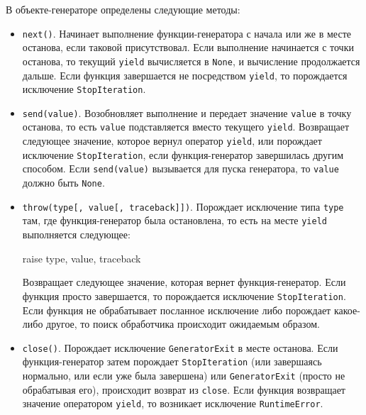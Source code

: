 В объекте-генераторе определены следующие методы:
\begin{itemize}
  \item \lstinline{next()}. Начинает выполнение функции-генератора с начала или же в месте останова, если таковой присутствовал. Если выполнение начинается с точки останова, то текущий \lstinline{yield} вычисляется в \lstinline{None}, и вычисление продолжается дальше. Если функция завершается не посредством \lstinline{yield}, то порождается исключение \lstinline{StopIteration}.

  \item \lstinline{send(value)}. Возобновляет выполнение и передает значение \lstinline{value} в точку останова, то есть \lstinline{value} подставляется вместо текущего \lstinline{yield}. Возвращает следующее значение, которое вернул оператор \lstinline{yield}, или порождает исключение \lstinline{StopIteration}, если функция-генератор завершилась другим способом. Если \lstinline{send(value)} вызывается для пуска генератора, то \lstinline{value} должно быть \lstinline{None}.

  \item \lstinline{throw(type[, value[, traceback]])}. Порождает исключение типа \lstinline{type} там, где функция-генератор была остановлена, то есть на месте \lstinline{yield} выполняется следующее:
\begin{pylst}{}{}
raise type, value, traceback
\end{pylst}
Возвращает следующее значение, которая вернет функция-генератор. Если функция просто завершается, то порождается исключение \lstinline{StopIteration}. Если функция не обрабатывает посланное исключение либо порождает какое-либо другое, то поиск обработчика происходит ожидаемым образом.

  \item \lstinline{close()}. Порождает исключение \lstinline{GeneratorExit} в месте останова. Если функция-генератор затем порождает \lstinline{StopIteration} (или завершаясь нормально, или если уже была завершена) или \lstinline{GeneratorExit} (просто не обрабатывая его), происходит возврат из \lstinline{close}. Если функция возвращает значение оператором \lstinline{yield}, то возникает исключение \lstinline{RuntimeError}.
\end{itemize}

